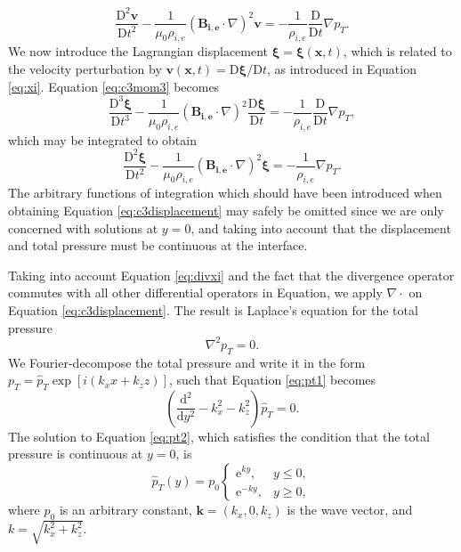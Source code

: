\documentclass[12pt]{ociamthesis}
\begin{document}
%
\begin{equation}
\label{eq:c3mom3}
\frac{\mathrm{D}^2 \mathbf{v}}{\mathrm{D} t^2}
- \frac{1}{\mu_0 \rho_{i, e}}( \mathbf{B_{i, e}} \cdot \nabla )^2 \mathbf{v}
= - \frac{1}{\rho_{i, e}} \frac{\mathrm{D}}{\mathrm{D} t} \nabla p_T.
\end{equation}
%
We now introduce the Lagrangian displacement $\bm \xi = \bm \xi(\mathbf{x}, t)$, which is related to the velocity perturbation by $\mathbf v (\mathbf{x}, t) = \mathrm{D} \bm \xi / \mathrm{D} t$, as introduced in Equation \eqref{eq:xi}.
Equation \eqref{eq:c3mom3} becomes
%
\begin{equation}
\label{eq:c3displacement0}
\frac{\mathrm{D}^3 \bm \xi}{\mathrm{D} t^3}
- \frac{1}{\mu_0\rho_{i, e}} ( \mathbf{B_{i, e}} \cdot \nabla )^2
\frac{\mathrm{D} \bm \xi}{\mathrm{D} t}
= - \frac{1}{\rho_{i, e}} \frac{\mathrm{D}}{\mathrm{D} t} \nabla p_T,
\end{equation}
%
which may be integrated to obtain
%
\begin{equation}
\label{eq:c3displacement}
\frac{\mathrm{D}^2 \bm \xi}{\mathrm{D} t^2}
- \frac{1}{\mu_0\rho_{i, e}} ( \mathbf{B_{i, e}} \cdot \nabla )^2 \bm \xi
= - \frac{1}{\rho_{i, e}} \nabla p_T.
\end{equation}
%
The arbitrary functions of integration which should have been introduced when obtaining Equation \eqref{eq:c3displacement} may safely be omitted since we are only concerned with solutions at $y=0$, and taking into account that the displacement and total pressure must be continuous at the interface.

Taking into account Equation \eqref{eq:divxi} and the fact that the divergence operator commutes with all other differential operators in Equation, we apply $\nabla \cdot$ on Equation \eqref{eq:c3displacement}.
The result is Laplace's equation for the total pressure
%
\begin{equation}
\label{eq:pt1}
\nabla^2 p_T = 0.
\end{equation}
%
We Fourier-decompose the total pressure and write it in the form $p_T = \hat p_T \exp[i (k_x x + k_z z)]$, such that Equation \eqref{eq:pt1} becomes
%
\begin{equation}
\label{eq:pt2}
\left( \frac{\mathrm{d}^2}{\mathrm{d} y^2} - k_x^2 - k_z^2 \right) \hat p_T = 0.
\end{equation}
%
The solution to Equation \eqref{eq:pt2}, which satisfies the condition that the total pressure is continuous at $y = 0$, is
%
\begin{equation}
\label{eq:ptsol}
\hat p_T(y) = p_0\left\{\begin{array}{cc} \mathrm{e}^{ky}, & y \leq 0, \\
\mathrm{e}^{-ky}, & y \geq 0 , \end{array}\right.
\end{equation}
%
where $p_0$ is an arbitrary constant, $\mathbf{k} = (k_x, 0, k_z)$ is the wave vector, and $k = \sqrt{k_x^2 + k_z^2}$.
\end{document}
